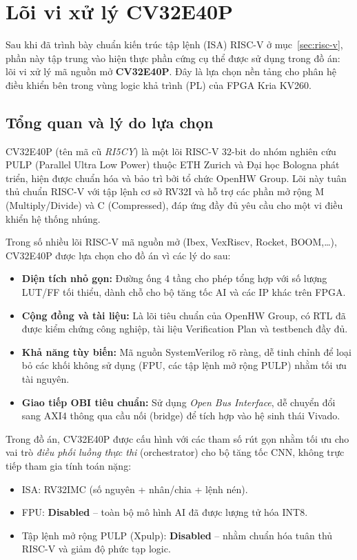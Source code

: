 %

\section{Lõi vi xử lý CV32E40P}

Sau khi đã trình bày chuẩn kiến trúc tập lệnh (ISA) RISC-V ở mục~\ref{sec:risc-v}, phần này tập trung vào hiện thực phần cứng cụ thể được sử dụng trong đồ án: lõi vi xử lý mã nguồn mở \textbf{CV32E40P}. Đây là lựa chọn nền tảng cho phân hệ điều khiển bên trong vùng logic khả trình (PL) của FPGA Kria KV260.

\subsection{Tổng quan và lý do lựa chọn}
CV32E40P (tên mã cũ \textit{RI5CY}) là một lõi RISC-V 32-bit do nhóm nghiên cứu PULP (Parallel Ultra Low Power) thuộc ETH Zurich và Đại học Bologna phát triển, hiện được chuẩn hóa và bảo trì bởi tổ chức OpenHW Group. Lõi này tuân thủ chuẩn RISC-V với tập lệnh cơ sở RV32I và hỗ trợ các phần mở rộng M (Multiply/Divide) và C (Compressed), đáp ứng đầy đủ yêu cầu cho một vi điều khiển hệ thống nhúng.

Trong số nhiều lõi RISC-V mã nguồn mở (Ibex, VexRiscv, Rocket, BOOM,\ldots), CV32E40P được lựa chọn cho đồ án vì các lý do sau:
\begin{itemize}
    \item \textbf{Diện tích nhỏ gọn:} Đường ống 4 tầng cho phép tổng hợp với số lượng LUT/FF tối thiểu, dành chỗ cho bộ tăng tốc AI và các IP khác trên FPGA.
    \item \textbf{Cộng đồng và tài liệu:} Là lõi tiêu chuẩn của OpenHW Group, có RTL đã được kiểm chứng công nghiệp, tài liệu Verification Plan và testbench đầy đủ.
    \item \textbf{Khả năng tùy biến:} Mã nguồn SystemVerilog rõ ràng, dễ tinh chỉnh để loại bỏ các khối không sử dụng (FPU, các tập lệnh mở rộng PULP) nhằm tối ưu tài nguyên.
    \item \textbf{Giao tiếp OBI tiêu chuẩn:} Sử dụng \textit{Open Bus Interface}, dễ chuyển đổi sang AXI4 thông qua cầu nối (bridge) để tích hợp vào hệ sinh thái Vivado.
\end{itemize}

Trong đồ án, CV32E40P được cấu hình với các tham số rút gọn nhằm tối ưu cho vai trò \textit{điều phối luồng thực thi} (orchestrator) cho bộ tăng tốc CNN, không trực tiếp tham gia tính toán nặng:
\begin{itemize}
    \item ISA: RV32IMC (số nguyên + nhân/chia + lệnh nén).
    \item FPU: \textbf{Disabled} -- toàn bộ mô hình AI đã được lượng tử hóa INT8.
    \item Tập lệnh mở rộng PULP (Xpulp): \textbf{Disabled} -- nhằm chuẩn hóa tuân thủ RISC-V và giảm độ phức tạp logic.
\end{itemize}


